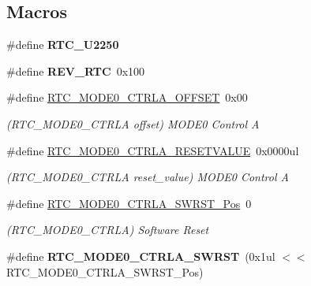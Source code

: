 \subsection*{Macros}
\begin{DoxyCompactItemize}
\item 
\hypertarget{group___s_a_m_l21___r_t_c_ga4e9b79b19658f7d747e3682058080576}{}\#define {\bfseries R\+T\+C\+\_\+\+U2250}\label{group___s_a_m_l21___r_t_c_ga4e9b79b19658f7d747e3682058080576}

\item 
\hypertarget{group___s_a_m_l21___r_t_c_gaff3debc3f3d16a4371e67a802f343c4e}{}\#define {\bfseries R\+E\+V\+\_\+\+R\+T\+C}~0x100\label{group___s_a_m_l21___r_t_c_gaff3debc3f3d16a4371e67a802f343c4e}

\item 
\hypertarget{group___s_a_m_l21___r_t_c_ga36104e712f5dc81e05a6593ea584a99e}{}\#define \hyperlink{group___s_a_m_l21___r_t_c_ga36104e712f5dc81e05a6593ea584a99e}{R\+T\+C\+\_\+\+M\+O\+D\+E0\+\_\+\+C\+T\+R\+L\+A\+\_\+\+O\+F\+F\+S\+E\+T}~0x00\label{group___s_a_m_l21___r_t_c_ga36104e712f5dc81e05a6593ea584a99e}

\begin{DoxyCompactList}\small\item\em (R\+T\+C\+\_\+\+M\+O\+D\+E0\+\_\+\+C\+T\+R\+L\+A offset) M\+O\+D\+E0 Control A \end{DoxyCompactList}\item 
\hypertarget{group___s_a_m_l21___r_t_c_ga9588f492fc00f45a4411317b50c8a899}{}\#define \hyperlink{group___s_a_m_l21___r_t_c_ga9588f492fc00f45a4411317b50c8a899}{R\+T\+C\+\_\+\+M\+O\+D\+E0\+\_\+\+C\+T\+R\+L\+A\+\_\+\+R\+E\+S\+E\+T\+V\+A\+L\+U\+E}~0x0000ul\label{group___s_a_m_l21___r_t_c_ga9588f492fc00f45a4411317b50c8a899}

\begin{DoxyCompactList}\small\item\em (R\+T\+C\+\_\+\+M\+O\+D\+E0\+\_\+\+C\+T\+R\+L\+A reset\+\_\+value) M\+O\+D\+E0 Control A \end{DoxyCompactList}\item 
\hypertarget{group___s_a_m_l21___r_t_c_ga3e956b90a6066e83a49d80768dcad2e6}{}\#define \hyperlink{group___s_a_m_l21___r_t_c_ga3e956b90a6066e83a49d80768dcad2e6}{R\+T\+C\+\_\+\+M\+O\+D\+E0\+\_\+\+C\+T\+R\+L\+A\+\_\+\+S\+W\+R\+S\+T\+\_\+\+Pos}~0\label{group___s_a_m_l21___r_t_c_ga3e956b90a6066e83a49d80768dcad2e6}

\begin{DoxyCompactList}\small\item\em (R\+T\+C\+\_\+\+M\+O\+D\+E0\+\_\+\+C\+T\+R\+L\+A) Software Reset \end{DoxyCompactList}\item 
\hypertarget{group___s_a_m_l21___r_t_c_gadb5c224d55e4997439fe5e4ee33cd927}{}\#define {\bfseries R\+T\+C\+\_\+\+M\+O\+D\+E0\+\_\+\+C\+T\+R\+L\+A\+\_\+\+S\+W\+R\+S\+T}~(0x1ul $<$$<$ R\+T\+C\+\_\+\+M\+O\+D\+E0\+\_\+\+C\+T\+R\+L\+A\+\_\+\+S\+W\+R\+S\+T\+\_\+\+Pos)\label{group___s_a_m_l21___r_t_c_gadb5c224d55e4997439fe5e4ee33cd927}


\end{DoxyCompactItemize}
